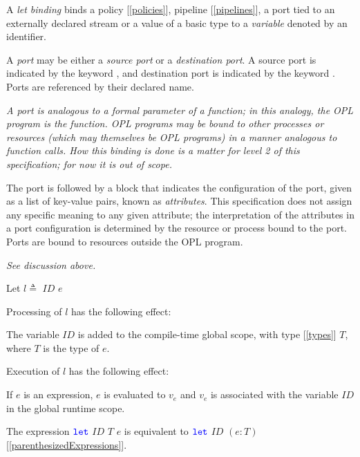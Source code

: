 \documentclass{article}
\begin{document}
A {\em let binding} binds a policy [\ref{policies}],  pipeline [\ref{pipelines}], a port tied to an externally declared stream or a value of a basic type to a {\em variable} denoted by an identifier.

\LetBinding{}

\Block{}

\PropertyList{}

\Property{}

\PropertyName{}

\PropertyValue{}

\Scalar{}

\ScalarArray{}

A {\em port} may be either a {\em source port} or a {\em destination port}.  A source port is indicated by the keyword \RECEIVER{}, and destination port is indicated by the keyword \EXPORTER. Ports are referenced by their declared name. 

{\em A port is analogous to a formal parameter of a function; in this analogy, the OPL program is the function.  OPL programs may be bound to other  processes or resources (which may themselves be OPL programs) in a manner analogous to function calls. How this binding is done is a matter for level 2 of this specification; for now it is out of scope.
}

The port is followed by a block that indicates the configuration of the port, given as a list of key-value pairs, known as {\em attributes}. This specification does not assign any specific meaning to any given attribute; the interpretation of the attributes in a port configuration is determined by the resource or process  bound to the port. Ports are bound to resources outside the OPL program.

{\em See discussion above. }

Let  $l \triangleq $ \LET{} $ID$  \BIND{} $e$

Processing of $l$  has the following effect:

The variable $ID$ is added to the compile-time global  scope, with type [\ref{types}] $T$, where  $T$ is the type of $e$.

Execution of $l$  has the following effect:

If $e$ is an expression, $e$ is evaluated to $v_e$ and $v_e$ is associated with the variable $ID$ in the global runtime scope.

The expression $\texttt{\color{blue} let}{}$ $ID$\COLON{} $T$ \BIND{} $e$ is equivalent to $\texttt{\color{blue} let}{}$ $ID$ \BIND{} $(e: T)$ [\ref{parenthesizedExpressions}].
\end{document}
